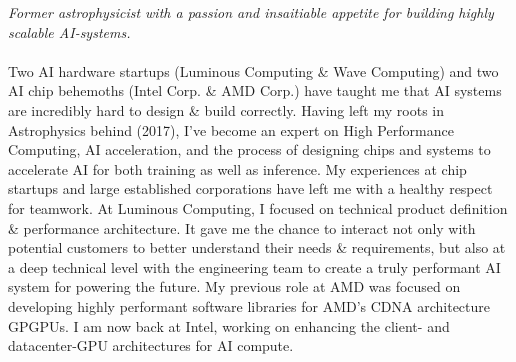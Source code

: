\documentclass[10pt,a4paper]{article}
\begin{document}
\vspace{-1.3em}  %
\begin{multicols}{2}  %
\noindent \emph{Former astrophysicist with a passion and insaitiable appetite for building highly scalable AI-systems.}
\\
\\
Two AI hardware startups (Luminous Computing \& Wave Computing) and two AI chip behemoths (Intel Corp. \& AMD Corp.) have taught me that AI systems are incredibly hard to design \& build correctly. Having left my roots in Astrophysics behind (2017), I've become an expert on High Performance Computing, AI acceleration, and the process of designing chips and systems to accelerate AI for both training as well as inference. My experiences at chip startups and large established corporations have left me with a healthy respect for teamwork. At Luminous Computing, I focused on technical product definition \& performance architecture. It gave me the chance to interact not only with potential customers to better understand their needs \& requirements, but also at a deep technical level with the engineering team to create a truly performant AI system for powering the future. My previous role at AMD was focused on developing highly performant software libraries for AMD's CDNA architecture GPGPUs. I am now back at Intel, working on enhancing the client- and datacenter-GPU architectures for AI compute. 





\end{multicols}
\end{document}
